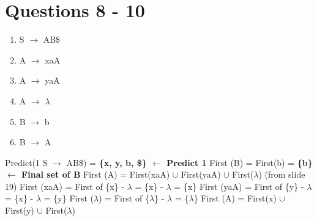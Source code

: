 \documentclass{report}
\begin{document}
\vspace{-3em}
\section{Questions 8 - 10}
\vspace{-1.5em}
\begin{multicols}{2}
  \begin{enumerate}
    \setlength\itemsep{-.25em}
    \item S $\rightarrow$ AB\$
    \item A $\rightarrow$ xaA
    \item A $\rightarrow$ yaA
    \item A $\rightarrow$ $\lambda$
    \item B $\rightarrow$ b
    \item B $\rightarrow$ A\newline\newline\newline\newline\newline\newline\newline\newline\newline\newline\newline
  \end{enumerate}
\setlength{\leftskip}{-12em}
Predict(1 S $\rightarrow$ AB\$) = \textbf{\{x, y, b, \$\} $\leftarrow$ Predict 1}\newline
\indent\hspace{.25cm}First (B) = First(b) = \textbf{ \{b\} $\leftarrow$ Final set of B}\newline
\indent\hspace{.25cm}First (A) = First(xaA) $\cup$  First(yaA) $\cup$  First($\lambda$) (from slide 19)\newline
\indent\hspace{1cm}First (xaA) = First of \{x\} - $\lambda$ = \{x\} - $\lambda$ = \{x\}\newline
\indent\hspace{1cm}First (yaA) = First of \{y\} - $\lambda$ = \{x\} - $\lambda$ = \{y\}\newline
\indent\hspace{1cm}First ($\lambda$) = First of \{$\lambda$\} - $\lambda$ = \{$\lambda$\}\newline
\indent\hspace{1cm}First (A) = First(x) $\cup$  First(y) $\cup$  First($\lambda$)\newline

\end{multicols}
\end{document}
